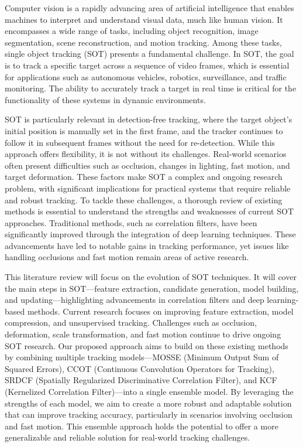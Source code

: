 \documentclass[11pt, letterpaper]{article}
\begin{document}
Computer vision is a rapidly advancing area of artificial intelligence that enables machines to interpret and understand visual data, much like human vision. It encompasses a wide range of tasks, including object recognition, image segmentation, scene reconstruction, and motion tracking. Among these tasks, single object tracking (SOT) presents a fundamental challenge. In SOT, the goal is to track a specific target across a sequence of video frames, which is essential for applications such as autonomous vehicles, robotics, surveillance, and traffic monitoring. The ability to accurately track a target in real time is critical for the functionality of these systems in dynamic environments.

SOT is particularly relevant in detection-free tracking, where the target object's initial position is manually set in the first frame, and the tracker continues to follow it in subsequent frames without the need for re-detection. While this approach offers flexibility, it is not without its challenges. Real-world scenarios often present difficulties such as occlusion, changes in lighting, fast motion, and target deformation. These factors make SOT a complex and ongoing research problem, with significant implications for practical systems that require reliable and robust tracking.
To tackle these challenges, a thorough review of existing methods is essential to understand the strengths and weaknesses of current SOT approaches. Traditional methods, such as correlation filters, have been significantly improved through the integration of deep learning techniques. These advancements have led to notable gains in tracking performance, yet issues like handling occlusions and fast motion remain areas of active research.

This literature review will focus on the evolution of SOT techniques. It will cover the main steps in SOT—feature extraction, candidate generation, model building, and updating—highlighting advancements in correlation filters and deep learning-based methods. Current research focuses on improving feature extraction, model compression, and unsupervised tracking. Challenges such as occlusion, deformation, scale transformation, and fast motion continue to drive ongoing SOT research.
Our proposed approach aims to build on these existing methods by combining multiple tracking models—MOSSE (Minimum Output Sum of Squared Errors), CCOT (Continuous Convolution Operators for Tracking), SRDCF (Spatially Regularized Discriminative Correlation Filter), and KCF (Kernelized Correlation Filter)—into a single ensemble model. By leveraging the strengths of each model, we aim to create a more robust and adaptable solution that can improve tracking accuracy, particularly in scenarios involving occlusion and fast motion. This ensemble approach holds the potential to offer a more generalizable and reliable solution for real-world tracking challenges.
\end{document}
